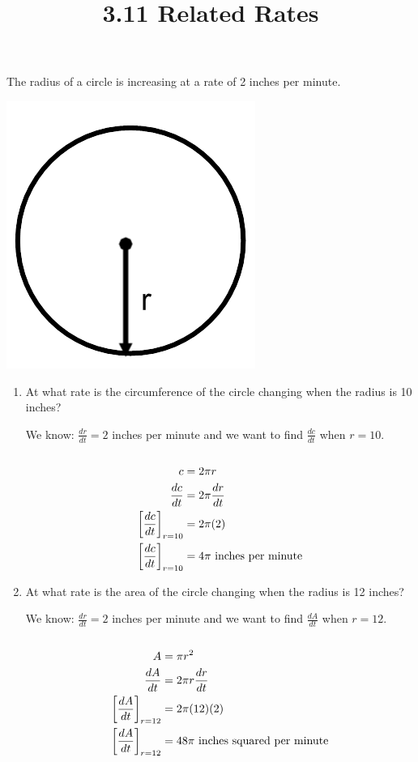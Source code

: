\documentclass[nooutcomes]{ximera}
\title{3.11 Related Rates}
\begin{document}
\begin{abstract}		\end{abstract}
\maketitle


\begin{problem}
The radius of a circle is increasing at a rate of 2 inches per minute. 
	\begin{image}
	\includegraphics[scale=.5]{Figure2.png}
	\end{image}

\begin{enumerate}
	\item At what rate is the circumference of the circle changing when the radius is 10 inches?
	\begin{freeResponse}
	We know: ${\frac{dr}{dt}}=2$ inches per minute and we want to find ${\frac{dc}{dt}}$ when $r=10$.\\\\
	\begin{align*}
	c&=2\pi r\\
	{\frac{dc}{dt}}&=2\pi {\frac{dr}{dt}}\\
	\bigg[ {\frac{dc}{dt}} \bigg]_{r=10}&=2 \pi (2)\\
	\bigg[ {\frac{dc}{dt}} \bigg]_{r=10}&=4 \pi\ \text{inches per minute}
	\end{align*}
	\end{freeResponse}
	\item At what rate is the area of the circle changing when the radius is 12 inches?
		\begin{freeResponse}
	We know: ${\frac{dr}{dt}}=2$ inches per minute and we want to find ${\frac{dA}{dt}}$ when $r=12$.\\\\
	\begin{align*}
	A&=\pi r^2\\
	{\frac{dA}{dt}}&=2\pi r{\frac{dr}{dt}}\\
	\bigg[ {\frac{dA}{dt}} \bigg]_{r=12}&=2 \pi (12)(2)\\
	\bigg[ {\frac{dA}{dt}} \bigg]_{r=12}&=48 \pi\ \text{inches squared per minute}
	\end{align*}
	\end{freeResponse}
\end{enumerate}

\end{problem}
\end{document}
